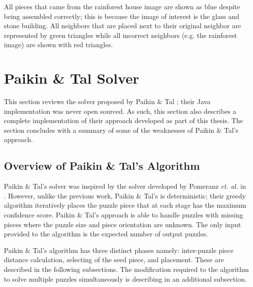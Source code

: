 \documentclass{report}
\begin{document}
All pieces that came from the rainforest house image are shown as blue despite being assembled correctly; this is because the image of interest is the glass and stone building.  All neighbors that are placed next to their original neighbor are represented by green triangles while all incorrect neighbors (e.g. the rainforest image) are shown with red triangles.









\pagebreak
\section{Paikin \& Tal Solver}\label{sec:paikinTalSolver}

This section reviews the solver proposed by Paikin \& Tal \cite{paikin2015}; their Java implementation was never open sourced.  As such, this section also describes a complete implementation of their approach developed as part of this thesis.  The section concludes with a summary of some of the weaknesses of Paikin \& Tal's approach. 

\subsection{Overview of Paikin \& Tal's Algorithm}\label{sec:paikinTalAlgorithm}

Paikin \& Tal's solver was inspired by the solver developed by Pomeranz \textit{et. al.} in \cite{pomeranz2011}.  However, unlike the previous work, Paikin \& Tal's is deterministic; their greedy algorithm iteratively places the puzzle piece that at each stage has the maximum confidence score. Paikin \& Tal's approach is able to handle puzzles with missing pieces where the puzzle size and piece orientation are unknown.  The only input provided to the algorithm is the expected number of output puzzles.

Paikin \& Tal's algorithm has three distinct phases namely: inter-puzzle piece distance calculation, selecting of the seed piece, and placement.  These are described in the following subsections.  The modification required to the algorithm to solve multiple puzzles simultaneously is describing in an additional subsection.
\end{document}
